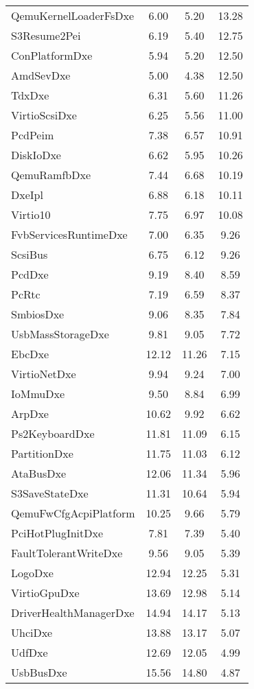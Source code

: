\begin{longtable}{l c c c}
  QemuKernelLoaderFsDxe & 6.00 & 5.20 & 13.28\\
  S3Resume2Pei & 6.19 & 5.40 & 12.75\\
  ConPlatformDxe & 5.94 & 5.20 & 12.50\\
  AmdSevDxe & 5.00 & 4.38 & 12.50\\
  TdxDxe & 6.31 & 5.60 & 11.26\\
  VirtioScsiDxe & 6.25 & 5.56 & 11.00\\
  PcdPeim & 7.38 & 6.57 & 10.91\\
  DiskIoDxe & 6.62 & 5.95 & 10.26\\
  QemuRamfbDxe & 7.44 & 6.68 & 10.19\\
  DxeIpl & 6.88 & 6.18 & 10.11\\
  Virtio10 & 7.75 & 6.97 & 10.08\\
  FvbServicesRuntimeDxe & 7.00 & 6.35 & 9.26\\
  ScsiBus & 6.75 & 6.12 & 9.26\\
  PcdDxe & 9.19 & 8.40 & 8.59\\
  PcRtc & 7.19 & 6.59 & 8.37\\
  SmbiosDxe & 9.06 & 8.35 & 7.84\\
  UsbMassStorageDxe & 9.81 & 9.05 & 7.72\\
  EbcDxe & 12.12 & 11.26 & 7.15\\
  VirtioNetDxe & 9.94 & 9.24 & 7.00\\
  IoMmuDxe & 9.50 & 8.84 & 6.99\\
  ArpDxe & 10.62 & 9.92 & 6.62\\
  Ps2KeyboardDxe & 11.81 & 11.09 & 6.15\\
  PartitionDxe & 11.75 & 11.03 & 6.12\\
  AtaBusDxe & 12.06 & 11.34 & 5.96\\
  S3SaveStateDxe & 11.31 & 10.64 & 5.94\\
  QemuFwCfgAcpiPlatform & 10.25 & 9.66 & 5.79\\
  PciHotPlugInitDxe & 7.81 & 7.39 & 5.40\\
  FaultTolerantWriteDxe & 9.56 & 9.05 & 5.39\\
  LogoDxe & 12.94 & 12.25 & 5.31\\
  VirtioGpuDxe & 13.69 & 12.98 & 5.14\\
  DriverHealthManagerDxe & 14.94 & 14.17 & 5.13\\
  UhciDxe & 13.88 & 13.17 & 5.07\\
  UdfDxe & 12.69 & 12.05 & 4.99\\
  UsbBusDxe & 15.56 & 14.80 & 4.87\\

\end{longtable}
